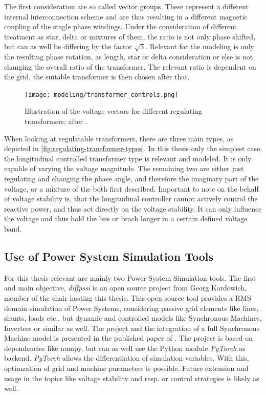 The first consideration are so called vector groups.
These represent a different internal interconnection scheme and are thus resulting in a different magnetic coupling of the single phase windings.
Under the consideration of different treatment as star, delta or mixtures of them, the ratio is not only phase shifted, but can as well be differing by the factor $\sqrt{3}$. 
Relevant for the modeling is only the resulting phase rotation, as length, star or delta consideration or else is not changing the overall ratio of the transformer.
The relevant ratio is dependent on the grid, the suitable transformer is then chosen after that.

\begin{figure}[htb!]
        \centering
        \texttt{[image: modeling/transformer\_controls.png]}
        \caption[Illustration of the voltage vectors for different regulating transformers]{Illustration of the voltage vectors for different regulating transformers; after \autocite{schwab_2022}.}
        \label{fig:regulating-transformer-types}
\end{figure}

When looking at regulatable transformers, there are three main types, as depicted in \autoref{fig:regulating-transformer-types}.
In this thesis only the simplest case, the longitudinal controlled transformer type is relevant and modeled. 
It is only capable of varying the voltage magnitude.
The remaining two are either just regulating and changing the phase angle, and therefore the imaginary part of the voltage, or a mixture of the both first described.
Important to note on the behalf of voltage stability is, that the longitudinal controller cannot actively control the reactive power, and thus act directly on the voltage stability.
It can only influence the voltage and thus hold the bus or brach longer in a certain defined voltage band.

\subsection{Use of Power System Simulation Tools}
\label{sec:simulation-tools}

For this thesis relevant are mainly two Power System Simulation tools.
The first and main objective, \textit{diffpssi} is an open source project from Georg Kordowich, member of the chair hosting this thesis.
This open source tool provides a \acs{RMS} domain simulation of Power Systems, considering passive grid elements like lines, shunts, loads etc., but dynamic and controlled models like Synchronous Machines, Inverters or similar as well.
The project and the integration of a full Synchronous Machine model is presented in the published paper of \textcite{kordowich_2023}.
The project is based on dependencies like numpy, but can as well use the Python module \textit{PyTorch} as backend.
\textit{PyTorch} allows the differentiation of simulation variables.
With this, optimzation of grid and machine parameters is possible.
Future extension and usage in the topics like voltage stability and resp. or control strategies is likely as well.

